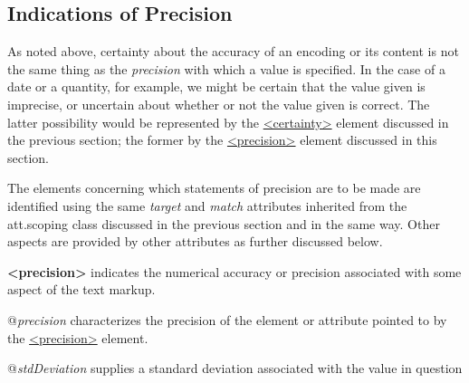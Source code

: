 \subsection[{Indications of Precision}]{Indications of Precision}\label{CEPREC}\par
As noted above, certainty about the accuracy of an encoding or its content is not the same thing as the \textit{precision} with which a value is specified. In the case of a date or a quantity, for example, we might be certain that the value given is imprecise, or uncertain about whether or not the value given is correct. The latter possibility would be represented by the \hyperref[TEI.certainty]{<certainty>} element discussed in the previous section; the former by the \hyperref[TEI.precision]{<precision>} element discussed in this section.\par
The elements concerning which statements of precision are to be made are identified using the same {\itshape target} and {\itshape match} attributes inherited from the \textsf{att.scoping} class discussed in the previous section and in the same way. Other aspects are provided by other attributes as further discussed below. 
\begin{sansreflist}
  
\item [\textbf{<precision>}] indicates the numerical accuracy or precision associated with some aspect of the text markup.\hfil\\[-10pt]\begin{sansreflist}
    \item[@{\itshape precision}]
  characterizes the precision of the element or attribute pointed to by the \hyperref[TEI.precision]{<precision>} element.
    \item[@{\itshape stdDeviation}]
  supplies a standard deviation associated with the value in question
\end{sansreflist}  
\end{sansreflist}
\par
